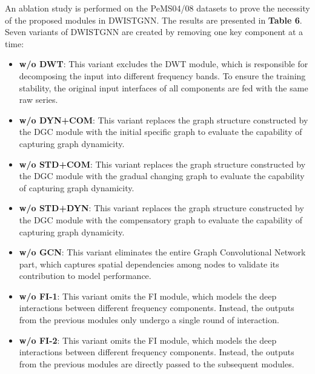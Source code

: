 \documentclass[final,12pt]{elsarticle}
\begin{document}
An ablation study is performed on the PeMS04/08 datasets 
to prove the necessity of the proposed modules in DWISTGNN.
The results are presented in \textbf{Table 6}.
Seven variants of DWISTGNN are created by 
removing one key component at a time: 
\begin{itemize}
\item \textbf{w/o DWT}: 
      This variant excludes the DWT module, 
      which is responsible for decomposing the input 
      into different frequency bands.
      To ensure the training stability, 
      the original input interfaces of all components 
      are fed with the same raw series.
\item \textbf{w/o DYN+COM}: 
      This variant replaces the graph structure 
      constructed by the DGC module 
      with the initial specific graph 
      to evaluate the capability of capturing graph dynamicity.
\item \textbf{w/o STD+COM}: 
      This variant replaces the graph structure 
      constructed by the DGC module 
      with the gradual changing graph 
      to evaluate the capability of capturing graph dynamicity.
\item \textbf{w/o STD+DYN}: 
      This variant replaces the graph structure 
      constructed by the DGC module 
      with the compensatory graph 
      to evaluate the capability of capturing graph dynamicity.
\item \textbf{w/o GCN}: 
      This variant eliminates the entire Graph Convolutional Network part, 
      which captures spatial dependencies among nodes 
      to validate its contribution to model performance.
\item \textbf{w/o FI-1}: 
      This variant omits the FI module, 
      which models the deep interactions between different frequency components.
      Instead, the outputs from the previous modules only 
      undergo a single round of interaction.
\item \textbf{w/o FI-2}: 
      This variant omits the FI module, 
      which models the deep interactions between different frequency components.
      Instead, the outputs from the previous modules are directly 
      passed to the subsequent modules.
\end{itemize}
\end{document}
